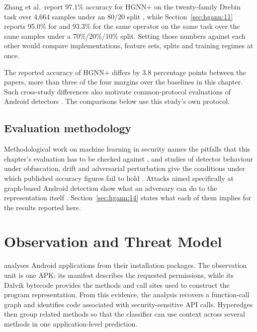 Zhang et al.\ report 97.1\% accuracy for HGNN+ on the
twenty-family Drebin task over 4,664 samples under an 80/20 split \cite{zhang2023android}, while
Section~\ref{sec:hgann:11} reports 95.0\% for \hgann{} and 93.3\% for the same
operator on the same task over the same samples under a 70\%/20\%/10\% split. Setting those numbers
against each other would compare implementations, feature sets, splits and training regimes at
once.

The reported accuracy of HGNN+ differs by 3.8 percentage points between the papers, more than
three of the four margins over the baselines in this chapter. Such cross-study differences also
motivate common-protocol evaluations of Android detectors \cite{liu2026unraveling, arp2022dos,
daoudi2021lessons}. The comparisons below use this study's own protocol.

\subsection*{Evaluation methodology}

Methodological work on machine learning in security names the pitfalls that this chapter's
evaluation has to be checked against \cite{arp2022dos}, and studies of detector behaviour under
obfuscation, drift and adversarial perturbation give the conditions under which published accuracy
figures fail to hold \cite{gao2024comprehensive, zhang2020apigraph, liu2026unraveling}. Attacks
aimed specifically at graph-based Android detection show what an adversary can do to the
representation itself \cite{zhao2021structural, song2026fcghunter, li2025efficient}.
Section~\ref{sec:hgann:14} states what each of them implies for the results reported here.

\section{Observation and Threat Model}
\label{sec:hgann:3}

\hgann{} analyses Android applications from their installation packages. The observation unit
is one APK: its manifest describes the requested permissions, while its Dalvik bytecode provides
the methods and call sites used to construct the program representation. From this evidence,
the analysis recovers a function-call graph and identifies code associated with security-sensitive
API calls. Hyperedges then group related methods so that the classifier can use context across
several methods in one application-level prediction.

